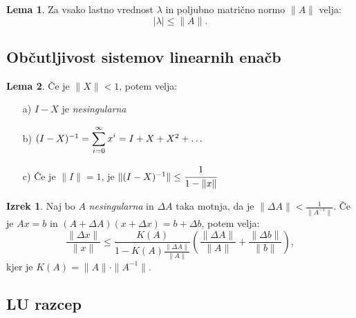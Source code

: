 \documentclass[11pt]{article}
\theoremstyle{definition}
\newtheorem{lema}{Lema}
\newtheorem{izrek}{Izrek}
\begin{document}
\begin{lema}

Za vsako lastno vrednost $\lambda$ in poljubno matrično normo $\|A\|$ velja:
$$|\lambda| \leq \|A\|.$$

\end{lema} 
\vspace{0.5cm}


\subsection{Občutljivost sistemov linearnih enačb}
\vspace{0.5cm}

\begin{lema}

Če je $\|X\| < 1$, potem velja:
\begin{enumerate}
	\item[a)] $I-X$ je \textit{nesingularna}
	\item[b)] $(I-X)^{-1} = \mathlarger{\sum_{i=0}^{\infty} x^i} = I + X + X^2 + \ldots$
	\item[c)] Če je $\|I\| = 1$, je $\|(I-X)^{-1}\| \leq \cfrac{1}{1-\|x\|}$
\end{enumerate}

\end{lema}
\vspace{0.5cm}

\begin{izrek}

Naj bo $A$ \textit{nesingularna} in $\Delta A$ taka motnja, da je $\|\Delta A\| < \frac{1}{\|A^{-1}\|}.$
Če je $Ax = b$ in $(A + \Delta A)(x + \Delta x) = b + \Delta b$, potem velja:
$$\frac{\|\Delta x\|}{\|x\|} \leq \frac{K(A)}{1 - K(A)\frac{\|\Delta A\|}{\|A\|}} \left( \frac{\|\Delta A\|}{\|A\|} + \frac{\|\Delta b\|}{\|b\|} \right),$$
kjer je $K(A) = \|A\| \cdot \|A^{-1}\|$.

\end{izrek}
\vspace{0.5cm}


\subsection{LU razcep}
\vspace{0.5cm}
\end{document}
